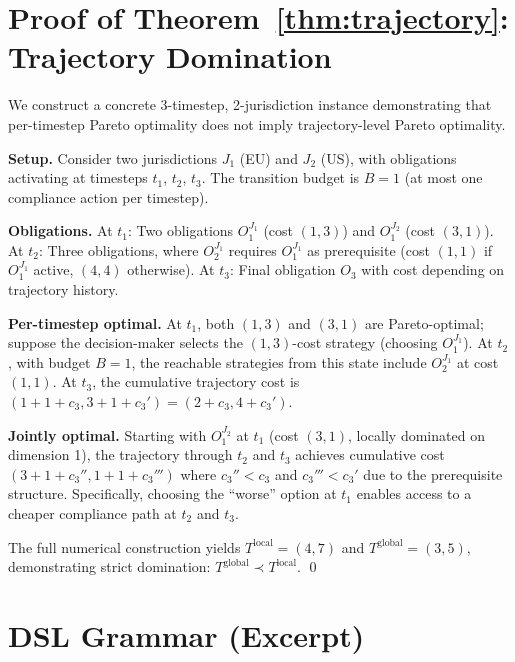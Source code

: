 \documentclass[11pt,twocolumn]{article}
\begin{document}
\appendix
\section{Proof of Theorem~\ref{thm:trajectory}: Trajectory Domination}
\label{app:proof}

We construct a concrete 3-timestep, 2-jurisdiction instance demonstrating that
per-timestep Pareto optimality does not imply trajectory-level Pareto optimality.

\textbf{Setup.} Consider two jurisdictions $J_1$ (EU) and $J_2$ (US), with
obligations activating at timesteps $t_1$, $t_2$, $t_3$. The transition budget
is $B = 1$ (at most one compliance action per timestep).

\textbf{Obligations.}
At $t_1$: Two obligations $O_1^{J_1}$ (cost $(1,3)$) and $O_1^{J_2}$ (cost $(3,1)$).
At $t_2$: Three obligations, where $O_2^{J_1}$ requires $O_1^{J_1}$ as prerequisite
(cost $(1,1)$ if $O_1^{J_1}$ active, $(4,4)$ otherwise).
At $t_3$: Final obligation $O_3$ with cost depending on trajectory history.

\textbf{Per-timestep optimal.} At $t_1$, both $(1,3)$ and $(3,1)$ are
Pareto-optimal; suppose the decision-maker selects the $(1,3)$-cost strategy
(choosing $O_1^{J_1}$). At $t_2$, with budget $B = 1$, the reachable strategies
from this state include $O_2^{J_1}$ at cost $(1,1)$. At $t_3$, the cumulative
trajectory cost is $(1+1+c_3, 3+1+c_3') = (2+c_3, 4+c_3')$.

\textbf{Jointly optimal.} Starting with $O_1^{J_2}$ at $t_1$ (cost $(3,1)$,
locally dominated on dimension 1), the trajectory through $t_2$ and $t_3$ achieves
cumulative cost $(3+1+c_3'', 1+1+c_3''')$ where $c_3'' < c_3$ and $c_3''' < c_3'$
due to the prerequisite structure. Specifically, choosing the ``worse'' option at
$t_1$ enables access to a cheaper compliance path at $t_2$ and $t_3$.

The full numerical construction yields $T^{\text{local}} = (4, 7)$ and
$T^{\text{global}} = (3, 5)$, demonstrating strict domination:
$T^{\text{global}} \prec T^{\text{local}}$. \qed

\section{DSL Grammar (Excerpt)}
\label{app:grammar}
\end{document}
